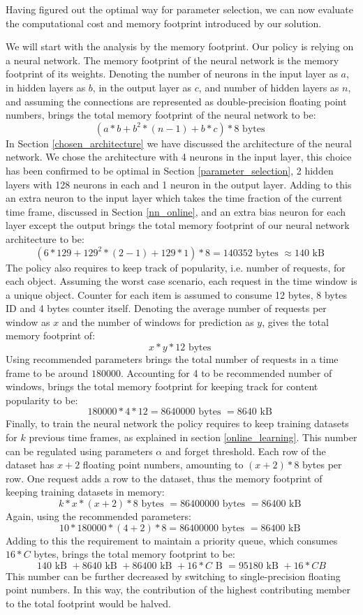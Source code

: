 Having figured out the optimal way for parameter selection, we can now evaluate the computational cost and memory footprint introduced by our solution. 

We will start with the analysis by the memory footprint. Our policy is relying on a neural network. The memory footprint of the neural network is the memory footprint of its weights. Denoting the number of neurons in the input layer as $a$, in hidden layers as $b$, in the output layer as $c$, and number of hidden layers as $n$, and assuming the connections are represented as double-precision floating point numbers, brings the total memory footprint of the neural network to be:
$$ (a * b + b^2 * (n - 1) + b * c) * 8 \text{ bytes } $$
In Section \ref{chosen_architecture} we have discussed the architecture of the neural network. We chose the architecture with 4 neurons in the input layer, this choice has been confirmed to be optimal in Section \ref{parameter_selection}, 2 hidden layers with 128 neurons in each and 1 neuron in the output layer. Adding to this an extra neuron to the input layer which takes the time fraction of the current time frame, discussed in Section \ref{nn_online}, and an extra bias neuron for each layer except the output brings the total memory footprint of our neural network architecture to be:
$$ (6 * 129 + 129^2 * (2 - 1) + 129 * 1) * 8 = 140352 \text{ bytes } \approx 140 \text{ kB } $$
The policy also requires to keep track of popularity, i.e. number of requests, for each object. Assuming the worst case scenario, each request in the time window is a unique object. Counter for each item is assumed to consume 12 bytes, 8 bytes ID and 4 bytes counter itself. Denoting the average number of requests per window as $x$ and the number of windows for prediction as $y$, gives the total memory footprint of:
$$ x * y * 12 \text{ bytes } $$
Using recommended parameters brings the total number of requests in a time frame to be around $ 180000 $. Accounting for 4 to be recommended number of  windows, brings the total memory footprint for keeping track for content popularity to be:
$$ 180000 * 4 * 12 = 8640000 \text{ bytes } = 8640 \text{ kB } $$
Finally, to train the neural network the policy requires to keep training datasets for $k$ previous time frames, as explained in section \ref{online_learning}. This number can be regulated using parameters $\alpha$ and forget threshold. Each row of the dataset has $x + 2$ floating point numbers, amounting to $(x + 2) * 8$ bytes per row. One request adds a row to the dataset, thus the memory footprint of keeping training datasets in memory:
$$ k * x * (x + 2) * 8 \text{ bytes } = 86400000 \text{ bytes } = 86400 \text{ kB }$$
Again, using the recommended parameters:
$$ 10 * 180000 * (4 + 2) * 8 = 86400000 \text{ bytes } = 86400 \text{ kB }$$
Adding to this the requirement to maintain a priority queue, which consumes $16 * C$ bytes, brings the total memory footprint to be:
$$ 140 \text{ kB } + 8640 \text{ kB } + 86400 \text{ kB } + 16 * C \text{ B } = 95180 \text{ kB } + 16 * C { B } $$
This number can be further decreased by switching to single-precision floating point numbers. In this way, the contribution of the highest contributing member to the total footprint would be halved.

